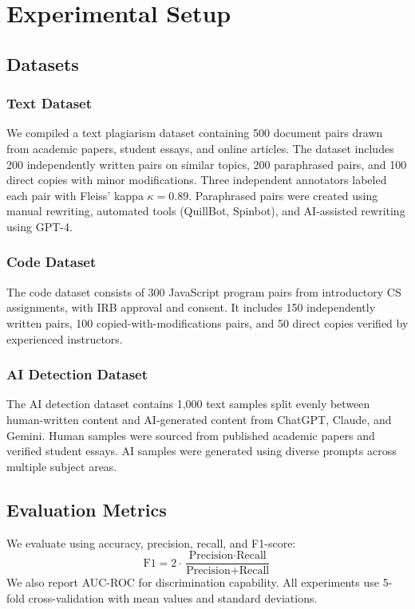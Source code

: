 \documentclass[10pt,twocolumn]{article}
\begin{document}
\section{Experimental Setup}

\subsection{Datasets}

\subsubsection{Text Dataset}
We compiled a text plagiarism dataset containing 500 document pairs drawn from academic papers, student essays, and online articles. The dataset includes 200 independently written pairs on similar topics, 200 paraphrased pairs, and 100 direct copies with minor modifications. Three independent annotators labeled each pair with Fleiss' kappa $\kappa = 0.89$. Paraphrased pairs were created using manual rewriting, automated tools (QuillBot, Spinbot), and AI-assisted rewriting using GPT-4.

\subsubsection{Code Dataset}
The code dataset consists of 300 JavaScript program pairs from introductory CS assignments, with IRB approval and consent. It includes 150 independently written pairs, 100 copied-with-modifications pairs, and 50 direct copies verified by experienced instructors.

\subsubsection{AI Detection Dataset}
The AI detection dataset contains 1,000 text samples split evenly between human-written content and AI-generated content from ChatGPT, Claude, and Gemini. Human samples were sourced from published academic papers and verified student essays. AI samples were generated using diverse prompts across multiple subject areas.

\subsection{Evaluation Metrics}

We evaluate using accuracy, precision, recall, and F1-score:
\begin{equation}
\text{F1} = 2 \cdot \frac{\text{Precision} \cdot \text{Recall}}{\text{Precision} + \text{Recall}}
\end{equation}
We also report AUC-ROC for discrimination capability. All experiments use 5-fold cross-validation with mean values and standard deviations.
\end{document}
